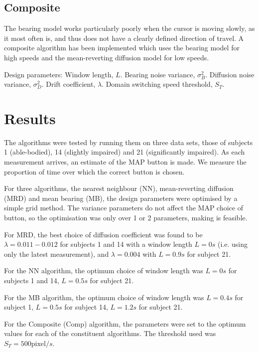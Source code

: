 \subsection{Composite}
The bearing model works particularly poorly when the cursor is moving slowly, as it most often is, and thus does not have a clearly defined direction of travel. A composite algorithm has been implemented which uses the bearing model for high speeds and the mean-reverting diffusion model for low speeds.

Design parameters: Window length, $L$. Bearing noise variance, $\sigma_B^2$. Diffusion noise variance, $\sigma_D^2$. Drift coefficient, $\lambda$. Domain switching speed threshold, $S_T$.



\section{Results}
The algorithms were tested by running them on three data sets, those of subjects 1 (able-bodied), 14 (slightly impaired) and 21 (significantly impaired). As each measurement arrives, an estimate of the MAP button is made. We measure the proportion of time over which the correct button is chosen.

For three algorithms, the nearest neighbour (NN), mean-reverting diffusion (MRD) and mean bearing (MB), the design parameters were optimised by a simple grid method. The variance parameters do not affect the MAP choice of button, so the optimisation was only over 1 or 2 parameters, making is feasible.

For MRD, the best choice of diffusion coefficient was found to be $\lambda = 0.011-0.012$ for subjects 1 and 14 with a window length $L=0s$ (i.e. using only the latest measurement), and $\lambda = 0.004$ with $L=0.9s$ for subject 21.

For the NN algorithm, the optimum choice of window length was $L=0s$ for subjects 1 and 14, $L=0.5s$ for subject 21.

For the MB algorithm, the optimum choice of window length was $L=0.4s$ for subject 1, $L=0.5s$ for subject 14, $L=1.2s$ for subject 21.

For the Composite (Comp) algorithm, the parameters were set to the optimum values for each of the constituent algorithms. The threshold used was $S_T = 500 \text{pixel}/s$.

\begin{table}[!h]
\caption{Table showing percentage of time for which each algorithm picks the correct button, with optimised parameters.}
\end{table}

